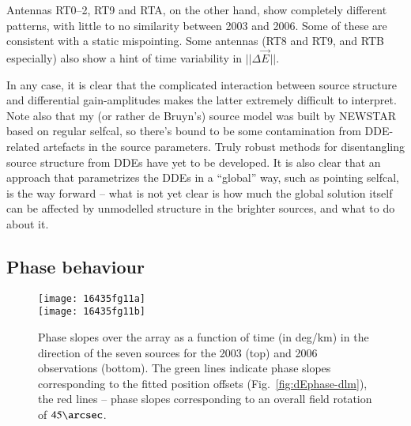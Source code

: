 \documentclass{aa}
\newcommand{\jones}[2]{\vec {#1}_{#2}}
\begin{document}
Antennas RT0--2, RT9 and RTA, on the other hand, show completely different patterns, with little to no similarity between 2003 and 2006. Some of these are consistent with a static mispointing. Some antennas (RT8 and RT9, and RTB especially) also show a hint of time variability in $||\Delta\jones{E}{}||$.

In any case, it is clear that the complicated interaction between source structure and differential gain-amplitudes makes the latter extremely difficult to interpret. Note also that my (or rather de Bruyn's) source model was built by NEWSTAR based on regular selfcal, so there's bound to be some contamination from DDE-related artefacts in the source parameters. 
Truly robust methods for disentangling source structure from DDEs have yet to be developed. It is also clear that an approach that parametrizes the DDEs in a ``global'' way, such as pointing selfcal, is the way forward -- what is not yet clear is how much the global solution itself can be affected by unmodelled structure in the brighter sources, and what to do about it.

\subsection{Phase behaviour}


\begin{figure}
\centering
\texttt{[image: 16435fg11a]}\\
\texttt{[image: 16435fg11b]}
\caption{\label{fig:dEphase-slope}Phase slopes over the array as a function of time (in deg/km) in the direction of the seven sources for the 2003 (top) and 2006 observations (bottom). The green lines indicate phase slopes corresponding to the fitted position offsets (Fig.~\ref{fig:dEphase-dlm}), the red lines -- phase slopes corresponding to an overall field rotation of $45\arcsec$.}
\end{figure}
\end{document}

